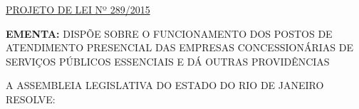 \documentclass[10pt]{article}
\date{}
\begin{document}
\maketitle
\begin{center}
  \huge
  \vspace{-3cm}\href{http://alerjln1.alerj.rj.gov.br/scpro1519.nsf/f4b46b3cdbba990083256cc900746cf6/f69ef1ae7bb1309283257e200051b11e?OpenDocument}{PROJETO DE LEI Nº 289/2015}
\bigskip
\bigskip
\bigskip
  
\end{center}

\textbf{EMENTA:} 
DISPÕE SOBRE O FUNCIONAMENTO DOS POSTOS DE ATENDIMENTO PRESENCIAL DAS EMPRESAS CONCESSIONÁRIAS DE SERVIÇOS PÚBLICOS ESSENCIAIS E DÁ OUTRAS PROVIDÊNCIAS 








\bigskip

\noindent
A ASSEMBLEIA LEGISLATIVA DO ESTADO DO RIO DE JANEIRO RESOLVE:
\end{document}
